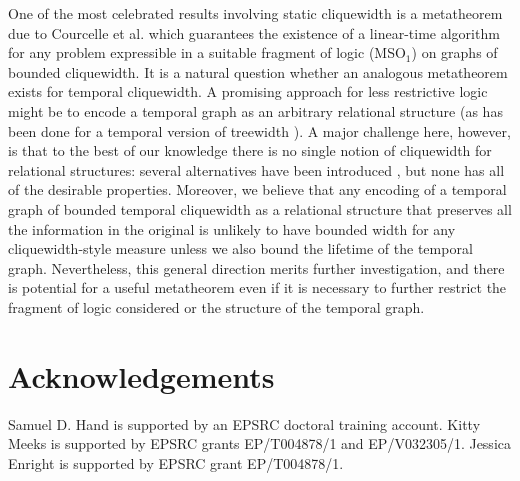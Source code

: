 \documentclass[preprint,12pt]{elsarticle}
\begin{document}
One of the most celebrated results involving static cliquewidth is a metatheorem due to Courcelle et al. \cite{courcelle_linear_2000} which guarantees the existence of a linear-time algorithm for any problem expressible in a suitable fragment of logic (MSO$_1$) on graphs of bounded cliquewidth.
It is a natural question whether an analogous metatheorem exists for temporal cliquewidth.  
A promising approach for less restrictive logic might be to encode a temporal graph as an arbitrary relational structure (as has been done for a temporal version of treewidth \cite{fluschnik_as_2020}).  
A major challenge here, however, is that to the best of our knowledge there is no single notion of cliquewidth for relational structures: several alternatives have been introduced \cite{DBLP:journals/corr/abs-0806-0103,courcelle_graph_2012}, but none has all of the desirable properties.  Moreover, we believe that any encoding of a temporal graph of bounded temporal cliquewidth as a relational structure that preserves all the information in the original is unlikely to have bounded width for any cliquewidth-style measure unless we also bound the lifetime of the temporal graph. Nevertheless, this general direction merits further investigation, and there is potential for a useful metatheorem even if it is necessary to further restrict the fragment of logic considered or the structure of the temporal graph.

\section{Acknowledgements}
Samuel D. Hand is supported by an EPSRC doctoral training account. Kitty Meeks is supported by EPSRC grants  EP/T004878/1 and EP/V032305/1. Jessica Enright is supported by EPSRC grant EP/T004878/1.
   
   
\end{document}
